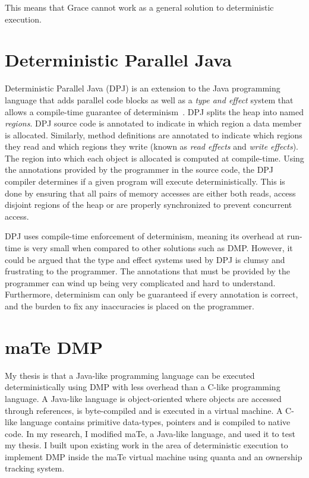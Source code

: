 This means that Grace cannot work as a general solution to
deterministic execution.

\section{Deterministic Parallel Java}

Deterministic Parallel Java (DPJ) is an extension to the Java
programming language that adds parallel code blocks as well as a
\emph{type and effect} system that allows a compile-time guarantee of
determinism~\cite{dpj}.  DPJ splits the heap into named
\emph{regions}.  DPJ source code is annotated to indicate in which
region a data member is allocated.  Similarly, method definitions are
annotated to indicate which regions they read and which regions they
write (known as \emph{read effects} and \emph{write effects}).  The
region into which each object is allocated is computed at
compile-time.  Using the annotations provided by the programmer in the
source code, the DPJ compiler determines if a given program will
execute deterministically.  This is done by ensuring that all pairs of
memory accesses are either both reads, access disjoint regions of the
heap or are properly synchronized to prevent concurrent access.

DPJ uses compile-time enforcement of determinism, meaning its overhead
at run-time is very small when compared to other solutions such as
DMP.  However, it could be argued that the type and effect systems
used by DPJ is clumsy and frustrating to the programmer.  The
annotations that must be provided by the programmer can wind up being
very complicated and hard to understand.  Furthermore, determinism can
only be guaranteed if every annotation is correct, and the burden to
fix any inaccuracies is placed on the programmer.

\section{maTe DMP}

My thesis is that a Java-like programming language can be executed
deterministically using DMP with less overhead than a C-like
programming language.  A Java-like language is object-oriented where
objects are accessed through references, is byte-compiled and is
executed in a virtual machine.  A C-like language contains primitive
data-types, pointers and is compiled to native code.  In my research,
I modified maTe, a Java-like language, and used it to test my thesis.
I built upon existing work in the area of deterministic execution to
implement DMP inside the maTe virtual machine using quanta and an
ownership tracking system.

